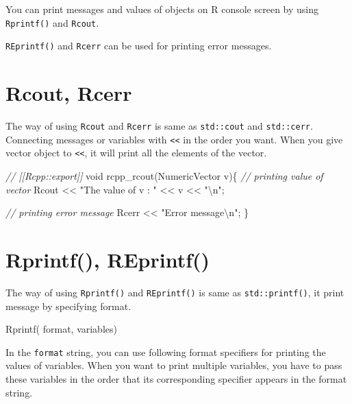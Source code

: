 \documentclass[]{book}
\newenvironment{Shaded}{\begin{snugshade}}{\end{snugshade}}
\newcommand{\CommentTok}[1]{\textcolor[rgb]{0.56,0.35,0.01}{\textit{#1}}}
\newcommand{\DataTypeTok}[1]{\textcolor[rgb]{0.13,0.29,0.53}{#1}}
\newcommand{\NormalTok}[1]{#1}
\newcommand{\SpecialCharTok}[1]{\textcolor[rgb]{0.00,0.00,0.00}{#1}}
\newcommand{\StringTok}[1]{\textcolor[rgb]{0.31,0.60,0.02}{#1}}
\begin{document}
You can print messages and values of objects on R console screen by using \texttt{Rprintf()} and \texttt{Rcout}.

\texttt{REprintf()} and \texttt{Rcerr} can be used for printing error messages.

\hypertarget{rcout-rcerr}{%
\section{Rcout, Rcerr}\label{rcout-rcerr}}

The way of using \texttt{Rcout} and \texttt{Rcerr} is same as \texttt{std::cout} and \texttt{std::cerr}. Connecting messages or variables with \texttt{\textless{}\textless{}} in the order you want. When you give vector object to \texttt{\textless{}\textless{}}, it will print all the elements of the vector.

\begin{Shaded}
\begin{Highlighting}[]
\CommentTok{// [[Rcpp::export]]}
\DataTypeTok{void}\NormalTok{ rcpp_rcout(NumericVector v)\{}
  \CommentTok{// printing value of vector}
\NormalTok{  Rcout << }\StringTok{"The value of v : "}\NormalTok{ << v << }\StringTok{"}\SpecialCharTok{\textbackslash{}n}\StringTok{"}\NormalTok{;}

  \CommentTok{// printing error message}
\NormalTok{  Rcerr << }\StringTok{"Error message}\SpecialCharTok{\textbackslash{}n}\StringTok{"}\NormalTok{;}
\NormalTok{\}}
\end{Highlighting}
\end{Shaded}

\hypertarget{rprintf-reprintf}{%
\section{Rprintf(), REprintf()}\label{rprintf-reprintf}}

The way of using \texttt{Rprintf()} and \texttt{REprintf()} is same as \texttt{std::printf()}, it print message by specifying format.

\begin{Shaded}
\begin{Highlighting}[]
\NormalTok{Rprintf( format, variables)}
\end{Highlighting}
\end{Shaded}

In the \texttt{format} string, you can use following format specifiers for printing the values of variables. When you want to print multiple variables, you have to pass these variables in the order that its corresponding specifier appears in the format string.
\end{document}
